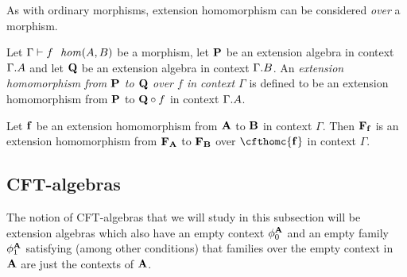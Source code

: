 As with ordinary morphisms, extension homomorphism can be considered \emph{over} a
morphism.

\begin{defn}
Let $\jhom{\Gamma}{A}{B}{f}$ be a morphism, let $\mathbf{P}$ be an extension
algebra in context $\ctxext{\Gamma}{A}$ and let $\mathbf{Q}$ be an extension
algebra in context $\ctxext{\Gamma}{B}$. An \emph{extension homomorphism from
$\mathbf{P}$ to $\mathbf{Q}$ over $f$ in context $\Gamma$} is defined to be
an extension homomorphism from $\mathbf{P}$ to $\jcomp{A}{f}{\extalg{Q}}$ in
context $\ctxext{\Gamma}{A}$. 
\end{defn}

\begin{eg}
Let $\mathbf{f}$ be an extension homomorphism from $\mathbf{A}$ to $\mathbf{B}$
in context $\Gamma$. Then $\mathbf{F}_{\mathbf{f}}$ is an
extension homomorphism from $\mathbf{F}_{\mathbf{A}}$ to $\mathbf{F}_{\mathbf{B}}$ over
$\cfthomc{\cfthom{f}}$ in context $\Gamma$.
\end{eg}

\subsection{CFT-algebras}
The notion of CFT-algebras that we will
study in this subsection will be extension algebras which also have an empty 
context $\phi_{0}^{\mathbf{A}}$ and an empty family $\phi_{1}^{\mathbf{A}}$ 
satisfying (among other conditions) that families over the empty context in
$\mathbf{A}$ are just the contexts of $\mathbf{A}$.

